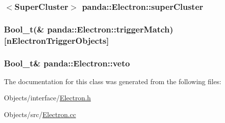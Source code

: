 \label{classpanda_1_1Electron_af63a95ef4a12371e908ec390aaff9c37}
\hypertarget{classpanda_1_1Electron_aa390943fba270ca2e54f846e67aa20be}{
\subsubsection[{superCluster}]{$<${\bf SuperCluster}$>$ {\bf panda::Electron::superCluster}}}
\label{classpanda_1_1Electron_aa390943fba270ca2e54f846e67aa20be}
\hypertarget{classpanda_1_1Electron_a416b97f96a625647771934f8d4f8e53d}{
\subsubsection[{triggerMatch}]{\setlength{\rightskip}{0pt plus 5cm}Bool\_\-t(\& {\bf panda::Electron::triggerMatch})\mbox{[}nElectronTriggerObjects\mbox{]}}}
\label{classpanda_1_1Electron_a416b97f96a625647771934f8d4f8e53d}
\hypertarget{classpanda_1_1Electron_acaa07729d3fd779aea2837d4acd7c284}{
\subsubsection[{veto}]{\setlength{\rightskip}{0pt plus 5cm}Bool\_\-t\& {\bf panda::Electron::veto}}}
\label{classpanda_1_1Electron_acaa07729d3fd779aea2837d4acd7c284}


The documentation for this class was generated from the following files:\begin{DoxyCompactItemize}
\item 
Objects/interface/\hyperlink{Electron_8h}{Electron.h}\item 
Objects/src/\hyperlink{Electron_8cc}{Electron.cc}\end{DoxyCompactItemize}
